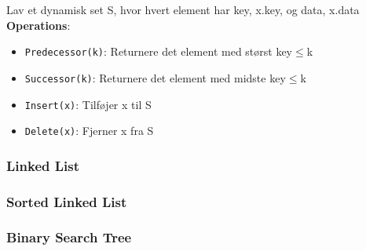 Lav et dynamisk set S, hvor hvert element har key, x.key, og data, x.data\\
\textbf{Operations}:
\begin{itemize}
	\item \texttt{Predecessor(k)}: Returnere det element med størst key$\leq$k
	\item \texttt{Successor(k)}: Returnere det element med midste key$\leq$k
	\item \texttt{Insert(x)}: Tilføjer x til S
	\item \texttt{Delete(x)}: Fjerner x fra S
\end{itemize}

\subsubsection{Linked List}

\newpage

\subsubsection{Sorted Linked List}

\newpage

\subsubsection{Binary Search Tree}
